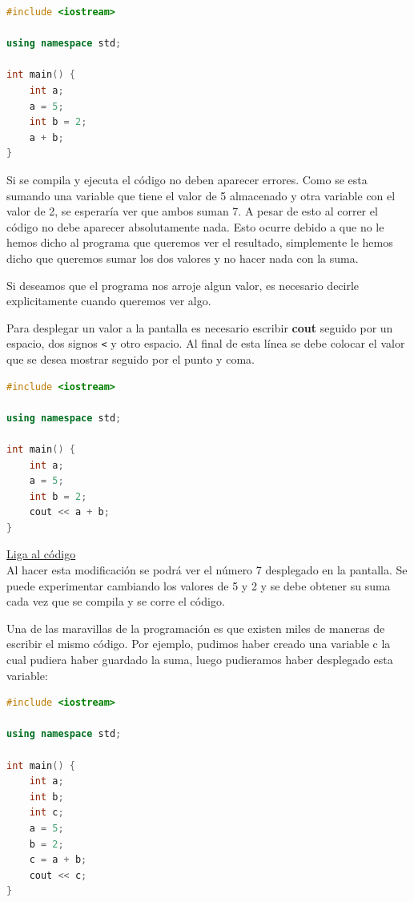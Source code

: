 \documentclass{article}
\begin{document}
\begin{lstlisting}[language=C++, title=¿La suma?]
#include <iostream>

using namespace std;

int main() {
	int a;
	a = 5;
	int b = 2;
	a + b;
}
\end{lstlisting}

Si se compila y ejecuta el código no deben aparecer errores. Como se esta sumando una variable que tiene el valor de 5 almacenado y otra variable con el valor de 2, se esperaría ver que ambos suman 7. A pesar de esto al correr el código no debe aparecer absolutamente nada. Esto ocurre debido a que no le hemos dicho al programa que queremos ver el resultado, simplemente le hemos dicho que queremos sumar los dos valores y no hacer nada con la suma.

Si deseamos que el programa nos arroje algun valor, es necesario decirle explicitamente cuando queremos ver algo.

Para desplegar un valor a la pantalla es necesario escribir \textbf{cout} seguido por un espacio, dos signos \lstinline{<} y otro espacio. Al final de esta línea se debe colocar el valor que se desea mostrar seguido por el punto y coma.

\begin{lstlisting}[language=C++, title=La suma]
#include <iostream>

using namespace std;

int main() {
	int a;
	a = 5;
	int b = 2;
	cout << a + b;
}
\end{lstlisting}
\href{https://repl.it/@Jamesscn/Mi-primer-programa}{Liga al código}\\

Al hacer esta modificación se podrá ver el número 7 desplegado en la pantalla. Se puede experimentar cambiando los valores de 5 y 2 y se debe obtener su suma cada vez que se compila y se corre el código.

Una de las maravillas de la programación es que existen miles de maneras de escribir el mismo código. Por ejemplo, pudimos haber creado una variable c la cual pudiera haber guardado la suma, luego pudieramos haber desplegado esta variable:

\begin{lstlisting}[language=C++, title=¿El mismo programa?]
#include <iostream>

using namespace std;

int main() {
	int a;
	int b;
	int c;
	a = 5;
	b = 2;
	c = a + b;
	cout << c;
}
\end{lstlisting}
\end{document}
